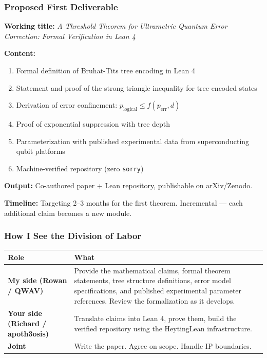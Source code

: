 \documentclass[11pt,a4paper]{article}
\begin{document}
\subsubsection*{Proposed First Deliverable}

\textbf{Working title:} \textit{A Threshold Theorem for Ultrametric Quantum Error Correction: Formal Verification in Lean 4}

\textbf{Content:}

\begin{enumerate}[nosep]
\item Formal definition of Bruhat-Tits tree encoding in Lean 4
\item Statement and proof of the strong triangle inequality for tree-encoded states
\item Derivation of error confinement: $p_{\text{logical}} \leq f(p_{\text{err}}, d)$
\item Proof of exponential suppression with tree depth
\item Parameterization with published experimental data from superconducting qubit platforms
\item Machine-verified repository (zero \texttt{sorry})
\end{enumerate}

\textbf{Output:} Co-authored paper + Lean repository, publishable on arXiv/Zenodo.

\textbf{Timeline:} Targeting 2–3 months for the first theorem. Incremental — each additional claim becomes a new module.

\subsubsection*{How I See the Division of Labor}

\begin{center}
\begin{longtable}{|l|l|}
\hline
\textbf{Role} & \textbf{What} \\ \hline
\endhead
\textbf{My side (Rowan / QWAV)} & Provide the mathematical claims, formal theorem statements, tree structure definitions, error model specifications, and published experimental parameter references. Review the formalization as it develops. \\ \hline
\textbf{Your side (Richard / apoth3osis)} & Translate claims into Lean 4, prove them, build the verified repository using the HeytingLean infrastructure. \\ \hline
\textbf{Joint} & Write the paper. Agree on scope. Handle IP boundaries. \\ \hline
\end{longtable}
\end{center}
\end{document}
